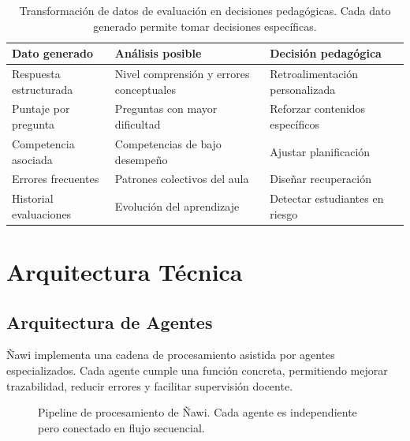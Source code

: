 \documentclass[12pt]{article}
\begin{document}
\begin{table}[H]
\centering
\small
\begin{tabular}{p{3.2cm} p{4cm} p{4cm}}
\toprule
\textbf{Dato generado} & \textbf{Análisis posible} & \textbf{Decisión pedagógica} \\
\midrule
Respuesta estructurada & Nivel comprensión y errores conceptuales & Retroalimentación personalizada \\
Puntaje por pregunta & Preguntas con mayor dificultad & Reforzar contenidos específicos \\
Competencia asociada & Competencias de bajo desempeño & Ajustar planificación \\
Errores frecuentes & Patrones colectivos del aula & Diseñar recuperación \\
Historial evaluaciones & Evolución del aprendizaje & Detectar estudiantes en riesgo \\
\bottomrule
\end{tabular}
\caption{Transformación de datos de evaluación en decisiones pedagógicas. Cada dato generado permite tomar decisiones específicas.}
\label{tabla:datos_decisiones}
\end{table}

\section{Arquitectura Técnica}

\subsection{Arquitectura de Agentes}

Ñawi implementa una cadena de procesamiento asistida por agentes especializados. Cada agente cumple una función concreta, permitiendo mejorar trazabilidad, reducir errores y facilitar supervisión docente.

\begin{figure}[H]
\centering
{}
\caption{Pipeline de procesamiento de Ñawi. Cada agente es independiente pero conectado en flujo secuencial.}
\label{fig:pipeline}
\end{figure}
\end{document}
